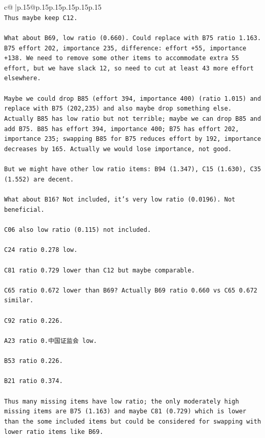 \documentclass{article}
\begin{document}
{\begin{supertabular}{c@{$\;$}|p{.15\linewidth}@{}p{.15\linewidth}p{.15\linewidth}p{.15\linewidth}p{.15\linewidth}p{.15\linewidth}}
{{{\\ 
\texttt{Thus maybe keep C12.} \\
\\ 
\texttt{What about B69, low ratio (0.660). Could replace with B75 ratio 1.163. B75 effort 202, importance 235, difference: effort +55, importance +138. We need to remove some other items to accommodate extra 55 effort, but we have slack 12, so need to cut at least 43 more effort elsewhere.} \\
\\ 
\texttt{Maybe we could drop B85 (effort 394, importance 400) (ratio 1.015) and replace with B75 (202,235) and also maybe drop something else. Actually B85 has low ratio but not terrible; maybe we can drop B85 and add B75. B85 has effort 394, importance 400; B75 has effort 202, importance 235; swapping B85 for B75 reduces effort by 192, importance decreases by 165. Actually we would lose importance, not good.} \\
\\ 
\texttt{But we might have other low ratio items: B94 (1.347), C15 (1.630), C35 (1.552) are decent.} \\
\\ 
\texttt{What about B16? Not included, it's very low ratio (0.0196). Not beneficial.} \\
\\ 
\texttt{C06 also low ratio (0.115) not included.} \\
\\ 
\texttt{C24 ratio 0.278 low.} \\
\\ 
\texttt{C81 ratio 0.729 lower than C12 but maybe comparable.} \\
\\ 
\texttt{C65 ratio 0.672 lower than B69? Actually B69 ratio 0.660 vs C65 0.672 similar.} \\
\\ 
\texttt{C92 ratio 0.226.} \\
\\ 
\texttt{A23 ratio 0.中国证监会 low.} \\
\\ 
\texttt{B53 ratio 0.226.} \\
\\ 
\texttt{B21 ratio 0.374.} \\
\\ 
\texttt{Thus many missing items have low ratio; the only moderately high missing items are B75 (1.163) and maybe C81 (0.729) which is lower than the some included items but could be considered for swapping with lower ratio items like B69.} \\
}}}
\end{supertabular}}
\end{document}
